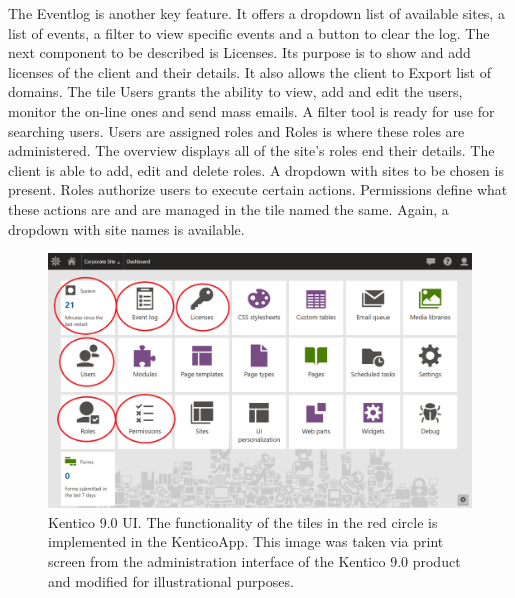 The Eventlog is another key feature. It offers a dropdown list of available sites, a list of events, a filter to view specific events and a button to clear the log. 
The next component to be described is Licenses. Its purpose is to show and add licenses of the client and their details. It also allows the client to Export list of domains. 
The tile Users grants the ability to view, add and edit the users, monitor the on-line ones and send mass emails. A filter tool is ready for use for searching users.
Users are assigned roles and Roles is where these roles are administered. The overview displays all of the site's roles end their details. The client is able to add, edit and delete roles. A dropdown with sites to be chosen is present. 
Roles authorize users to execute certain actions. Permissions define what these actions are and are managed in the tile named the same. Again, a dropdown with site names is available. 

\begin{figure}[ht!]
  \centering
  \includegraphics[width=\textwidth]{Images/Kentico9.png}
  \caption{Kentico 9.0 UI. The functionality of the tiles in the red circle is implemented in the KenticoApp. This image was
taken via print screen from the administration interface of the Kentico 9.0 product and modified for illustrational purposes.}
  \label{kentico9UI}
\end{figure} 

